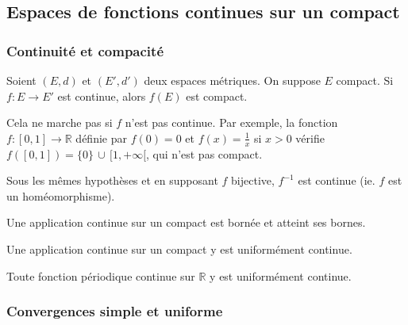 




  \subsection{Espaces de fonctions continues sur un compact}

  \subsubsection{Continuité et compacité}


  \begin{proposition}
    Soient $(E, d)$ et $(E', d')$ deux espaces métriques. On suppose $E$ compact. Si $f : E \rightarrow E'$ est continue, alors $f(E)$ est compact.
  \end{proposition}

  \begin{cexample}
    Cela ne marche pas si $f$ n'est pas continue. Par exemple, la fonction $f : [0,1] \rightarrow \mathbb{R}$ définie par $f(0)=0$ et $f(x)=\frac{1}{x}$ si $x>0$ vérifie $f([0,1]) = \{0\} \, \cup \, [1,+\infty[$, qui n'est pas compact.
  \end{cexample}

  \begin{proposition}
    Sous les mêmes hypothèses et en supposant $f$ bijective, $f^{-1}$ est continue (ie. $f$ est un homéomorphisme).
  \end{proposition}

  \begin{theorem}
    Une application continue sur un compact est bornée et atteint ses bornes.
  \end{theorem}

  \begin{theorem}
    Une application continue sur un compact y est uniformément continue.
  \end{theorem}

  \begin{corollary}
    Toute fonction périodique continue sur $\mathbb{R}$ y est uniformément continue.
  \end{corollary}

  \subsubsection{Convergences simple et uniforme}


